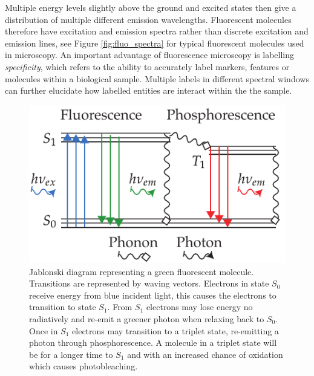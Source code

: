 Multiple energy levels slightly above the ground and excited states then give a distribution of multiple different emission wavelengths.
Fluorescent molecules therefore have excitation and emission spectra rather than discrete excitation and emission lines, see Figure \ref{fig:fluo_spectra} for typical fluorescent molecules used in microscopy.
An important advantage of fluorescence microscopy is labelling \emph{specificity}, which refers to the ability to accurately label markers, features or molecules within a biological sample.
Multiple labels in different spectral windows can further elucidate how labelled entities are interact within the the sample.

\begin{figure}
    \centering
    \includegraphics{jablonski_triplet_newer}
    \caption[Standard jablonski diagram]{
    Jablonski diagram representing a green fluorescent molecule.
    Transitions are represented by waving vectors.
    Electrons in state $S_0$ receive energy from blue incident light,
    this causes the electrons to transition to state $S_1$.
    From $S_1$ electrons may lose energy no radiatively and re-emit a greener photon when relaxing back to $S_0$.
    Once in $S_1$ electrons may transition to a triplet state, re-emitting a photon through phosphorescence.
    A molecule in a triplet state will be for a longer time to $S_1$ and with an increased chance of oxidation which causes photobleaching.%
        }
    \label{fig:jablonski_triplet_new}
\end{figure}



